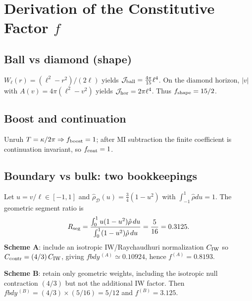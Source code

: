 \documentclass[aps,prd,onecolumn,superscriptaddress,nofootinbib]{revtex4-2}
\def\fbdy{fbdy}%
\newcommand{\fbdy}{f_{\rm bdy}}
\begin{document}
\section{Derivation of the Constitutive Factor \(f\)}
\label{app:f-normalization}
\subsection{Ball vs diamond (shape)}
\(W_\ell(r)=(\ell^2-r^2)/(2\ell)\) yields \(\mathcal J_{\rm ball}=\frac{4\pi}{15}\ell^4\).
On the diamond horizon, \(|v|\) with \(A(v)=4\pi(\ell^2-v^2)\) yields \(\mathcal J_{\rm hor}=2\pi\ell^4\).
Thus \(f_{\rm shape}=15/2\).

\subsection{Boost and continuation}
Unruh \(T=\kappa/2\pi\Rightarrow f_{\rm boost}=1\); after MI subtraction the finite coefficient is continuation invariant, so \(f_{\rm cont}=1\).

\subsection{Boundary vs bulk: two bookkeepings}
\label{app:fbdy-derivation}
Let \(u=v/\ell\in[-1,1]\) and \(\hat\rho_{\mathcal D}(u)=\tfrac{3}{4}(1-u^2)\) with \(\int_{-1}^1\hat\rho du=1\).
The geometric segment ratio is
\[
R_{\rm seg}=
\frac{\int_{0}^{1} u(1-u^2)\hat\rho\,du}{\int_{0}^{1} (1-u^2)\hat\rho\,du}
=\frac{5}{16}=0.3125.
\]
\textbf{Scheme A}: include an isotropic IW/Raychaudhuri normalization \(C_{\rm IW}\) so \(C_{\rm contr}=({4}/{3})\,C_{\rm IW}\), giving \(\fbdy^{\,(A)}\simeq0.10924\), hence \(f^{(A)}=0.8193\).

\textbf{Scheme B}: retain only geometric weights, including the isotropic null contraction \((4/3)\) but not the additional IW factor. Then \(\fbdy^{\,(B)}=(4/3)\times (5/16)=5/12\) and \(f^{(B)}=3.125\).
\end{document}
